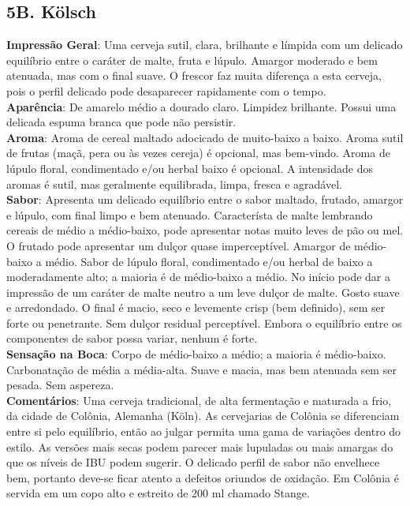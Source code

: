 \subsection*{5B. Kölsch}
\textbf{Impressão Geral}: Uma cerveja sutil, clara, brilhante e límpida com um delicado equilíbrio entre o caráter de malte, fruta e lúpulo. Amargor moderado e bem atenuada, mas com o final suave. O frescor faz muita diferença a esta cerveja, pois o perfil delicado pode desaparecer rapidamente com o tempo. \\
\textbf{Aparência}: De amarelo médio a dourado claro. Limpidez brilhante. Possui uma delicada espuma branca que pode não persistir. \\
\textbf{Aroma}: Aroma de cereal maltado adocicado de muito-baixo a baixo. Aroma sutil de frutas (maçã, pera ou às vezes cereja) é opcional, mas bem-vindo. Aroma de lúpulo floral, condimentado e/ou herbal baixo é opcional. A intensidade dos aromas é sutil, mas geralmente equilibrada, limpa, fresca e agradável. \\
\textbf{Sabor}: Apresenta um delicado equilíbrio entre o sabor maltado, frutado, amargor e lúpulo, com final limpo e bem atenuado. Característa de malte lembrando cereais de médio a médio-baixo, pode apresentar notas muito leves de pão ou mel. O frutado pode apresentar um dulçor quase imperceptível. Amargor de médio-baixo a médio. Sabor de lúpulo floral, condimentado e/ou herbal de baixo a moderadamente alto; a maioria é de médio-baixo a médio. No início pode dar a impressão de um caráter de malte neutro a um leve dulçor de malte. Gosto suave e arredondado. O final é macio, seco e levemente crisp (bem definido), sem ser forte ou penetrante. Sem dulçor residual perceptível. Embora o equilíbrio entre os componentes de sabor possa variar, nenhum é forte. \\
\textbf{Sensação na Boca}: Corpo de médio-baixo a médio; a maioria é médio-baixo. Carbonatação de média a média-alta. Suave e macia, mas bem atenuada sem ser pesada. Sem aspereza. \\
\textbf{Comentários}: Uma cerveja tradicional, de alta fermentação e maturada a frio, da cidade de Colônia, Alemanha (Köln). As cervejarias de Colônia se diferenciam entre si pelo equilíbrio, então ao julgar permita uma gama de variações dentro do estilo. As versões mais secas podem parecer mais lupuladas ou mais amargas do que os níveis de IBU podem sugerir. O delicado perfil de sabor não envelhece bem, portanto deve-se ficar atento a defeitos oriundos de oxidação. Em Colônia é servida em um copo alto e estreito de 200 ml chamado Stange. \\

